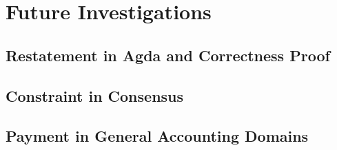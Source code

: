 \documentclass[a4paper,10pt]{report}
\begin{document}
\chapter{Future Investigations}

\section{Restatement in Agda and Correctness Proof}

\section{Constraint in Consensus}

\section{Payment in General Accounting Domains}

\newpage
\printbibliography{}
\end{document}
